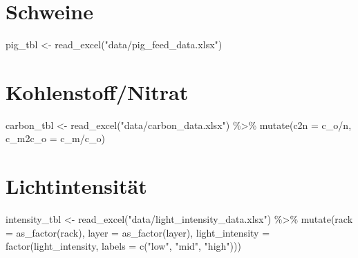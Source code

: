 \documentclass[
  letterpaper,
  DIV=11,
  oneside]{scrreport}
\newenvironment{Shaded}{\begin{snugshade}}{\end{snugshade}}
\newcommand{\AttributeTok}[1]{\textcolor[rgb]{0.40,0.45,0.13}{#1}}
\newcommand{\FunctionTok}[1]{\textcolor[rgb]{0.28,0.35,0.67}{#1}}
\newcommand{\NormalTok}[1]{\textcolor[rgb]{0.00,0.23,0.31}{#1}}
\newcommand{\OtherTok}[1]{\textcolor[rgb]{0.00,0.23,0.31}{#1}}
\newcommand{\SpecialCharTok}[1]{\textcolor[rgb]{0.37,0.37,0.37}{#1}}
\newcommand{\StringTok}[1]{\textcolor[rgb]{0.13,0.47,0.30}{#1}}
\begin{document}
\hypertarget{schweine}{%
\section{Schweine}\label{schweine}}

\begin{Shaded}
\begin{Highlighting}[]
\NormalTok{pig\_tbl }\OtherTok{\textless{}{-}} \FunctionTok{read\_excel}\NormalTok{(}\StringTok{"data/pig\_feed\_data.xlsx"}\NormalTok{)}
\end{Highlighting}
\end{Shaded}

\hypertarget{kohlenstoffnitrat}{%
\section{Kohlenstoff/Nitrat}\label{kohlenstoffnitrat}}

\begin{Shaded}
\begin{Highlighting}[]
\NormalTok{carbon\_tbl }\OtherTok{\textless{}{-}} \FunctionTok{read\_excel}\NormalTok{(}\StringTok{"data/carbon\_data.xlsx"}\NormalTok{) }\SpecialCharTok{\%\textgreater{}\%} 
  \FunctionTok{mutate}\NormalTok{(}\AttributeTok{c2n =}\NormalTok{ c\_o}\SpecialCharTok{/}\NormalTok{n,}
         \AttributeTok{c\_m2c\_o =}\NormalTok{ c\_m}\SpecialCharTok{/}\NormalTok{c\_o)}
\end{Highlighting}
\end{Shaded}

\hypertarget{lichtintensituxe4t}{%
\section{Lichtintensität}\label{lichtintensituxe4t}}

\begin{Shaded}
\begin{Highlighting}[]
\NormalTok{intensity\_tbl }\OtherTok{\textless{}{-}} \FunctionTok{read\_excel}\NormalTok{(}\StringTok{"data/light\_intensity\_data.xlsx"}\NormalTok{) }\SpecialCharTok{\%\textgreater{}\%} 
  \FunctionTok{mutate}\NormalTok{(}\AttributeTok{rack =} \FunctionTok{as\_factor}\NormalTok{(rack),}
         \AttributeTok{layer =} \FunctionTok{as\_factor}\NormalTok{(layer),}
         \AttributeTok{light\_intensity =} \FunctionTok{factor}\NormalTok{(light\_intensity, }
                                  \AttributeTok{labels =} \FunctionTok{c}\NormalTok{(}\StringTok{"low"}\NormalTok{, }\StringTok{"mid"}\NormalTok{, }\StringTok{"high"}\NormalTok{)))}
\end{Highlighting}
\end{Shaded}
\end{document}
